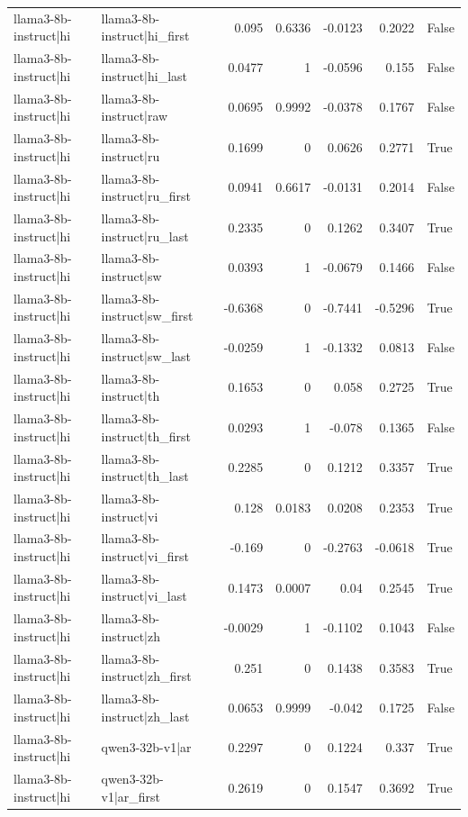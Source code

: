 \begin{table}
\begin{tabular}{l l r r r r l}
llama3-8b-instruct|hi & llama3-8b-instruct|hi_first & 0.095 & 0.6336 & -0.0123 & 0.2022 & False \\
llama3-8b-instruct|hi & llama3-8b-instruct|hi_last & 0.0477 & 1 & -0.0596 & 0.155 & False \\
llama3-8b-instruct|hi & llama3-8b-instruct|raw & 0.0695 & 0.9992 & -0.0378 & 0.1767 & False \\
llama3-8b-instruct|hi & llama3-8b-instruct|ru & 0.1699 & 0 & 0.0626 & 0.2771 & True \\
llama3-8b-instruct|hi & llama3-8b-instruct|ru_first & 0.0941 & 0.6617 & -0.0131 & 0.2014 & False \\
llama3-8b-instruct|hi & llama3-8b-instruct|ru_last & 0.2335 & 0 & 0.1262 & 0.3407 & True \\
llama3-8b-instruct|hi & llama3-8b-instruct|sw & 0.0393 & 1 & -0.0679 & 0.1466 & False \\
llama3-8b-instruct|hi & llama3-8b-instruct|sw_first & -0.6368 & 0 & -0.7441 & -0.5296 & True \\
llama3-8b-instruct|hi & llama3-8b-instruct|sw_last & -0.0259 & 1 & -0.1332 & 0.0813 & False \\
llama3-8b-instruct|hi & llama3-8b-instruct|th & 0.1653 & 0 & 0.058 & 0.2725 & True \\
llama3-8b-instruct|hi & llama3-8b-instruct|th_first & 0.0293 & 1 & -0.078 & 0.1365 & False \\
llama3-8b-instruct|hi & llama3-8b-instruct|th_last & 0.2285 & 0 & 0.1212 & 0.3357 & True \\
llama3-8b-instruct|hi & llama3-8b-instruct|vi & 0.128 & 0.0183 & 0.0208 & 0.2353 & True \\
llama3-8b-instruct|hi & llama3-8b-instruct|vi_first & -0.169 & 0 & -0.2763 & -0.0618 & True \\
llama3-8b-instruct|hi & llama3-8b-instruct|vi_last & 0.1473 & 0.0007 & 0.04 & 0.2545 & True \\
llama3-8b-instruct|hi & llama3-8b-instruct|zh & -0.0029 & 1 & -0.1102 & 0.1043 & False \\
llama3-8b-instruct|hi & llama3-8b-instruct|zh_first & 0.251 & 0 & 0.1438 & 0.3583 & True \\
llama3-8b-instruct|hi & llama3-8b-instruct|zh_last & 0.0653 & 0.9999 & -0.042 & 0.1725 & False \\
llama3-8b-instruct|hi & qwen3-32b-v1|ar & 0.2297 & 0 & 0.1224 & 0.337 & True \\
llama3-8b-instruct|hi & qwen3-32b-v1|ar_first & 0.2619 & 0 & 0.1547 & 0.3692 & True \\

\end{tabular}
\end{table}
